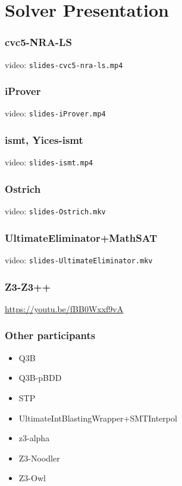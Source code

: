 \documentclass[table]{beamer}
\newcommand\vitem{\vfill\item}
\begin{document}
\section{Solver Presentation}

\newcommand{\myincludepdf}[1]{
\begin{frame}
  \vspace*{-1pt}%
  \noindent\makebox[\textwidth]{%
    \texttt{[image: \#1]}}
\end{frame}
}

\newcommand{\myvideopdf}[2]{
\begin{frame}
  \frametitle{#1}
  \begin{center}
    video: \texttt{#2}
  \end{center}
\end{frame}
}

\myincludepdf{slides-bitwuzla.pdf}

\myincludepdf{slides-colibri.pdf}

\myincludepdf{slides-cvc5.pdf}

\myvideopdf{cvc5-NRA-LS}{slides-cvc5-nra-ls.mp4}

\myvideopdf{iProver}{slides-iProver.mp4}

\myvideopdf{ismt, Yices-ismt}{slides-ismt.mp4}

\myincludepdf{slides-ismt-ppt.pdf}

\myincludepdf{slides-opensmt.pdf}

\myvideopdf{Ostrich}{slides-Ostrich.mkv}

\myincludepdf{slides-smtinterpol.pdf}

\myincludepdf{slides-smtrat.pdf}

\myvideopdf{UltimateEliminator+MathSAT}{slides-UltimateEliminator.mkv}

\myincludepdf{slides-vampire.pdf}

\myincludepdf{slides-yaga.pdf}

\myincludepdf{slides-Yices-2025.pdf}

\myincludepdf{slides-YicesQS-2025.pdf}

\begin{frame}
  \frametitle{Z3-Z3++}

  \begin{center}
    \url{https://youtu.be/fBB0Wxxf9vA}
  \end{center}
\end{frame}

  \begin{frame}
    \frametitle{Other participants}
    \begin{itemize}
\item Q3B
\vitem Q3B-pBDD
\vitem STP
\vitem UltimateIntBlastingWrapper+SMTInterpol
\vitem z3-alpha
\vitem Z3-Noodler
\vitem Z3-Owl
    \end{itemize}
  \end{frame}
\end{document}
